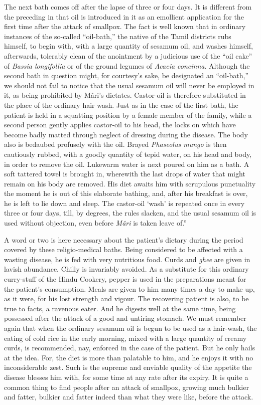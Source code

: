 \documentclass[a4paper, 12pt, oneside, english]{article}
\begin{document}
The next bath comes off after the lapse of three or four days. It is different from the preceding in that oil is introduced in it as an emollient application for the first time after the attack of smallpox. The fact is well known that in ordinary instances of the so-called ``oil-bath,'' the native of the Tamil districts rubs himself, to begin with, with a large quantity of sesamum oil, and washes himself, afterwards, tolerably clean of the anointment by a judicious use of the ``oil cake'' of \emph{Bassia longifollia} or of the ground legumes of \emph{Acacia concinna}. Although the second bath in question might, for courtesy's sake, be designated an ``oil-bath,'' we should not fail to notice that the usual sesamum oil will never be employed in it, as being prohibited by Mâri's dictates. Castor-oil is therefore substituted in the place of the ordinary hair wash. Just as in the case of the first bath, the patient is held in a squatting position by a female member of the family, while a second person gently applies castor-oil to his head, the locks on which have become badly matted through neglect of dressing during the disease. The body also is bedaubed profusely with the oil. Brayed \emph{Phaseolus mungo} is then cautiously rubbed, with a goodly quantity of tepid water, on his head and body, in order to remove the oil. Lukewarm water is next poured on him as a bath. A soft tattered towel is brought in, wherewith the last drops of water that might remain on his body are removed. His diet awaits him with scrupulous punctuality the moment he is out of this elaborate bathing, and, after his breakfast is over, he is left to lie down and sleep. The castor-oil `wash' is repeated once in every three or four days, till, by degrees, the rules slacken, and the usual sesamum oil is used without objection, even before \emph{Mâri} is taken leave of.''

A word or two is here necessary about the patient's dietary during the period covered by these religio-medical baths. Being considered to be affected with a wasting disease, he is fed with very nutritious food. Curds and \emph{ghee} are given in lavish abundance. Chilly is invariably avoided. As a substitute for this ordinary curry-stuff of the Hindu Cookery, pepper is used in the preparations meant for the patient's consumption. Meals are given to him many times a day to make up, as it were, for his lost strength and vigour. The recovering patient is also, to be true to facts, a ravenous eater. And he digests well at the same time, being possessed after the attack of a good and untiring stomach. We must remember again that when the ordinary sesamum oil is begun to be used as a hair-wash, the eating of cold rice in the early morning, mixed with a large quantity of creamy curds, is recommended, nay, enforced in the case of the patient. But he only hails at the idea. For, the diet is more than palatable to him, and he enjoys it with no inconsiderable zest. Such is the supreme and enviable quality of the appetite the disease blesses him with, for some time at any rate after its expiry. It is quite a common thing to find people after an attack of smallpox, growing much bulkier and fatter, bulkier and fatter indeed than what they were like, before the attack.
\end{document}
